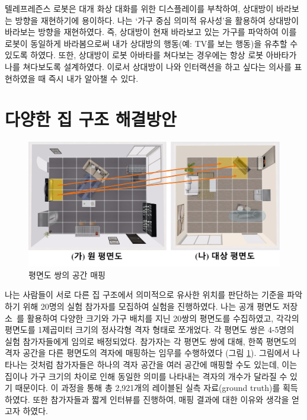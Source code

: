 텔레프레즌스 로봇은 대개 화상 대화를 위한 디스플레이를 부착하여, 상대방이 바라보는 방향을 재현하기에 용이하다. 나는 `가구 중심 의미적 유사성'을 활용하여 상대방이 바라보는 방향을 재현하였다. 즉, 상대방이 현재 바라보고 있는 가구를 파악하여 이를 로봇이 동일하게 바라봄으로써 내가 상대방의 행동(예: TV를 보는 행동)을 유추할 수 있도록 하였다. 또한, 상대방이 로봇 아바타를 쳐다보는 경우에는 항상 로봇 아바타가 나를 쳐다보도록 설계하였다. 이로서 상대방이 나와 인터랙션을 하고 싶다는 의사를 표현하였을 때 즉시 내가 알아챌 수 있다.

\section{다양한 집 구조 해결방안}
\label{subsec:home_heterogeneity}


\begin{figure}
\centering
\includegraphics[width=15cm]{images/mapping.pdf}
\caption{평면도 쌍의 공간 매핑}
\label{fig:mapping}
\end{figure}

나는 사람들이 서로 다른 집 구조에서 의미적으로 유사한 위치를 판단하는 기준을 파악하기 위해 20명의 실험 참가자를 모집하여 실험을 진행하였다. 나는 공개 평면도 저장소~\cite{floorplanner}를 활용하여 다양한 크기와 가구 배치를 지닌 20쌍의 평면도를 수집하였고, 각각의 평면도를 1제곱미터 크기의 정사각형 격자 형태로 쪼개었다. 각 평면도 쌍은 4-5명의 실험 참가자들에게 임의로 배정되었다. 참가자는 각 평면도 쌍에 대해, 한쪽 평면도의 격자 공간을 다른 평면도의 격자에 매핑하는 임무를 수행하였다 (그림 \ref{fig:mapping}). 그림에서 나타나는 것처럼 참가자들은 하나의 격자 공간을 여러 공간에 매핑할 수도 있는데, 이는 집이나 가구 크기의 차이로 인해 동일한 의미를 나타내는 격자의 개수가 달라질 수 있기 때문이다. 이 과정을 통해 총 2,921개의 레이블된 실측 자료(ground truth)를 획득하였다. 또한 참가자들과 짧게 인터뷰를 진행하여, 매핑 결과에 대한 이유와 생각을 얻고자 하였다.

